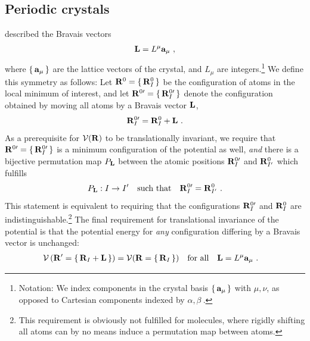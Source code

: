 \subsection{Periodic crystals}
described the Bravais vectors 
\begin{align}
	{\bf L} = L^\mu {\bf a}_\mu~,
	\label{eq:L_Bravais}
\end{align}
where $\set{{\bf a}_\mu}$ are the lattice vectors of the crystal, and $L_\mu$ are integers.\footnote{Notation: We index components in the crystal basis $\set{{\bf a}_\mu}$ with $\mu, \nu$, as opposed to Cartesian components indexed by $\alpha, \beta~.$}
We define this symmetry as follows:
Let ${\bf R}^0 = \set{{\bf R}_I^0}$ be the configuration of atoms in the local minimum of interest, and let ${\bf R}^{0 \prime} = \set{{\bf R}^{0 \prime}_{I}}$ denote the configuration obtained by moving all atoms by a Bravais vector ${\bf L}$,
\begin{align}
	{\bf R}^{0 \prime}_{I} = {\bf R}^0_{I} + {\bf L}~.
	\label{eq:RI'}
\end{align}
As a prerequisite for $\mathcal V ({\bf R})$ to be translationally invariant, we require that ${\bf R}^{0 \prime} = \set{{\bf R}^{0 \prime}_{I}}$ is a minimum configuration of the potential as well, \emph{and} there is a bijective permutation map $P_{\bf L}$ between the atomic positions ${\bf R}^{0 \prime}_{I}$ and ${\bf R}^{0}_{I'}$ which fulfills
\begin{align}
	P_{\bf L} : I \to I' \quad\text{such that}\quad
	{\bf R}^{0 \prime}_{I}
		= {\bf R}^{0}_{I'}~.
	\label{eq:translation.permutation}
\end{align}
This statement is equivalent to requiring that the configurations ${\bf R}^{0 \prime}_{I}$ and ${\bf R}^{0}_{I}$ are indistinguishable.\footnote{This requirement is obviously not fulfilled for molecules, where rigidly shifting all atoms can by no means induce a permutation map between atoms.} 
The final requirement for translational invariance of the potential is that the potential energy for \emph{any} configuration differing by a Bravais vector is unchanged:
\begin{align}
	\mathcal{V} \left( {\bf R}' = \set{{\bf R}_{I} + {\bf L}} \right)
	&= \mathcal{V}({\bf R} = \set{{\bf R}_{I}} ) 
	\quad\text{for all}\quad {\bf L} = L^\mu {\bf a}_\mu~.
	\label{eq:inv.V}
\end{align}

